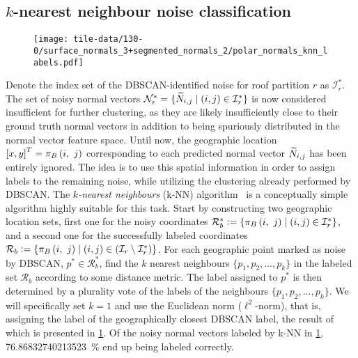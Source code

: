 \subsection{\texorpdfstring{$k$}{k}-nearest neighbour noise classification}
\begin{wrapfigure}[11]{r}{0.35\textwidth}
  \vspace{-3em}
  \centering
  \texttt{[image: tile-data/130-0/surface\_normals\_3+segmented\_normals\_2/polar\_normals\_knn\_labels.pdf]}
  \label{fig:polar-normal-knn-labels}
\end{wrapfigure}
Denote the index set of the DBSCAN-identified noise for roof partition $r$ as $\mathcal{I}_r^*$.
The set of noisy normal vectors $\mathcal{N}_r^* = \{\widetilde{N}_{i,j} \mid (i, j) \in \mathcal{I}_r^*\}$ is now considered insufficient for further clustering, as they are likely insufficiently close to their ground truth normal vectors in addition to being spuriously distributed in the normal vector feature space.
Until now, the geographic location ${[x, y]}^T = \pi_{B}\left(i,~j\right)$ corresponding to each predicted normal vector $\widetilde{N}_{i,j}$ has been entirely ignored.
The idea is to use this spatial information in order to assign labels to the remaining noise, while utilizing the clustering already performed by DBSCAN.
The \textit{$k$-nearest neighbours} (k-NN) algorithm~\cite{knn} is a conceptually simple algorithm highly suitable for this task.
Start by constructing two geographic location sets, first one for the noisy coordinates $\mathcal{R}_b^* \vcentcolon= \{\pi_{B}\left(i,~j\right) \mid (i, j) \in \mathcal{I}_r^* \}$, and a second one for the successfully labeled coordinates $\mathcal{R}_b \vcentcolon= \{\pi_{B}\left(i,~j\right) \mid (i, j) \in (\mathcal{I}_r \setminus \mathcal{I}_r^*)\}$.
For each geographic point marked as noise by DBSCAN, $p^* \in \mathcal{R}_b^*$, find the $k$ nearest neighbours $\{p_1, p_2, \ldots, p_k\}$ in the labeled set $\mathcal{R}_b$ according to some distance metric.
The label assigned to $p^*$ is then determined by a plurality vote of the labels of the neighbours $\{p_1, p_2, \ldots, p_k\}$.
We will specifically set $k = 1$ and use the Euclidean norm ($\ell^2$-norm), that is, assigning the label of the geographically closest DBSCAN label, the result of which is presented in \cref{fig:polar-normal-knn-labels}.
Of the noisy normal vectors labeled by k-NN in \cref{fig:polar-normal-knn-labels}, \SI[round-mode=places,round-precision=1]{76.86832740213523}{\percent} end up being labeled correctly.
